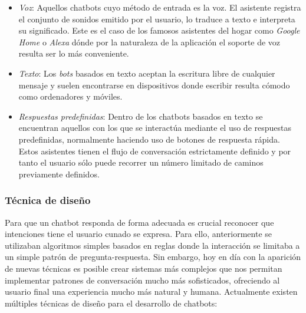 \begin{itemize}
	\item \textit{Voz}: Aquellos chatbots cuyo método de entrada es la voz. El asistente registra el conjunto de sonidos emitido por el usuario, lo traduce a texto e interpreta su significado. Este es el caso de los famosos asistentes del hogar como \textit{Google Home} o \textit{Alexa} dónde por la naturaleza de la aplicación el soporte de voz resulta ser lo más conveniente.
	\item \textit{Texto}: Los \textit{bots} basados en texto aceptan la escritura libre de cualquier mensaje y suelen encontrarse en dispositivos donde escribir resulta cómodo como ordenadores y móviles.
	\item \textit{Respuestas predefinidas}: Dentro de los chatbots basados en texto se encuentran aquellos con los que se interactúa mediante el uso de respuestas predefinidas, normalmente haciendo uso de botones de respuesta rápida. Estos asistentes tienen el flujo de conversación estrictamente definido y por tanto el usuario sólo puede recorrer un número limitado de caminos previamente definidos.
\end{itemize}



\subsubsection{Técnica de diseño}
\label{tecdis}
Para que un chatbot responda de forma adecuada es crucial reconocer que intenciones tiene el usuario cunado se expresa. Para ello, anteriormente se utilizaban algoritmos simples basados en reglas donde la interacción se limitaba a un simple patrón de pregunta-respuesta. Sin embargo, hoy en día con la aparición de nuevas técnicas es posible crear sistemas más complejos que nos permitan implementar patrones de conversación mucho más sofisticados, ofreciendo al usuario final una experiencia mucho más natural y humana. Actualmente existen múltiples técnicas de diseño para el desarrollo de chatbots:

